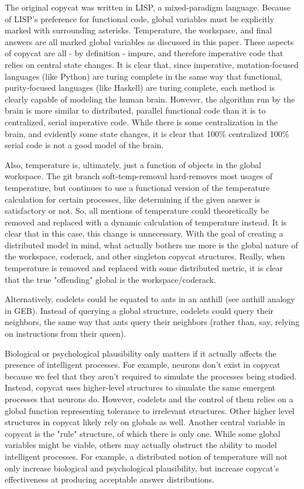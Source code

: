 \documentclass[a4paper]{article}
\begin{document}
    \break

    The original copycat was written in LISP, a mixed-paradigm language.
    Because of LISP's preference for functional code, global variables must be explicitly marked with surrounding asterisks.
    Temperature, the workspace, and final answers are all marked global variables as discussed in this paper.
    These aspects of copycat are all - by definition - impure, and therefore imperative code that relies on central state changes.
    It is clear that, since imperative, mutation-focused languages (like Python) are turing complete in the same way that functional, purity-focused languages (like Haskell) are turing complete, each method is clearly capable of modeling the human brain.
    However, the algorithm run by the brain is more similar to distributed, parallel functional code than it is to centralized, serial imperative code.
    While there is some centralization in the brain, and evidently some state changes, it is clear that 100\% centralized 100\% serial code is not a good model of the brain.

    Also, temperature is, ultimately, just a function of objects in the global workspace.
    The git branch soft-temp-removal hard-removes most usages of temperature, but continues to use a functional version of the temperature calculation for certain processes, like determining if the given answer is satisfactory or not.
    So, all mentions of temperature could theoretically be removed and replaced with a dynamic calculation of temperature instead.
    It is clear that in this case, this change is unnecessary.
    With the goal of creating a distributed model in mind, what actually bothers me more is the global nature of the workspace, coderack, and other singleton copycat structures.
    Really, when temperature is removed and replaced with some distributed metric, it is clear that the true "offending" global is the workspace/coderack.

    Alternatively, codelets could be equated to ants in an anthill (see anthill analogy in GEB).
    Instead of querying a global structure, codelets could query their neighbors, the same way that ants query their neighbors (rather than, say, relying on instructions from their queen).

Biological or psychological plausibility only matters if it actually affects the presence of intelligent processes. For example, neurons don't exist in copycat because we feel that they aren't required to simulate the processes being studied. Instead, copycat uses higher-level structures to simulate the same emergent processes that neurons do. However, codelets and the control of them relies on a global function representing tolerance to irrelevant structures. Other higher level structures in copycat likely rely on globals as well. Another central variable in copycat is the "rule" structure, of which there is only one. While some global variables might be viable, others may actually obstruct the ability to model intelligent processes. For example, a distributed notion of temperature will not only increase biological and psychological plausibility, but increase copycat's effectiveness at producing acceptable answer distributions.
\end{document}
